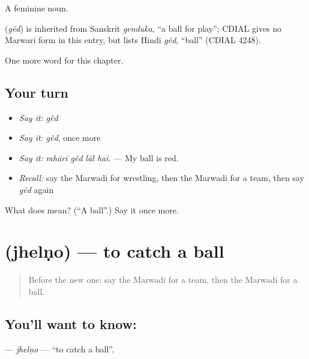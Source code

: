 A feminine noun.

\begin{cousinweb}
\textbf{} (\emph{gẽd}) is inherited from Sanskrit \emph{genduka}, \textquotedblleft{}a ball for play\textquotedblright{}; CDIAL gives no Marwari form in this entry, but lists Hindi \emph{gẽd}, \textquotedblleft{}ball\textquotedblright{} (CDIAL 4248).
\end{cousinweb}

\begin{grammarlens}[title={What you've built}]
One more word for this chapter.
\end{grammarlens}

\subsection*{Your turn}
\begin{itemize}
\raggedright
  \item \emph{Say it:} \emph{gẽd}
  \item \emph{Say it:} \emph{gẽd}, once more
  \item \emph{Say it:} \emph{mhārī gẽd lāl hai.} — My ball is red.
  \item \emph{Recall:} say the Marwadi for wrestling, then the Marwadi for a team, then say \emph{gẽd} again
\end{itemize}

\begin{tcolorbox}[breakable,colback=teal!4,colframe=teal!35!black,title={Before you move on}]
What does  mean? (\textquotedblleft{}A ball\textquotedblright{}.) Say it once more.
\end{tcolorbox}
\section[\texorpdfstring{\mw{झेलणो} (jhelṇo)}{झेलणो (jhelṇo)}]{ (jhelṇo) — to catch a ball}

\label{lesson:MW-C280-jhelno}



\begin{quote}
Before the new one: say the Marwadi for a team, then the Marwadi for a ball.
\end{quote}

\subsection*{You'll want to know: }
\textbf{} — \emph{jhelṇo} — \textquotedblleft{}to catch a ball\textquotedblright{}.

